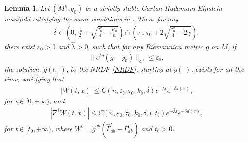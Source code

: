 \documentclass[12pt]{amsart}
\newtheorem{lemma}{Lemma}[section]
\begin{document}
\begin{lemma}\label{The evolution equation of the deTurck term}
    Let $(M^n, g_0)$ be a strictly stable Cartan-Hadamard Einstein manifold satisfying the same conditions in . Then, for any 
    \begin{align}\label{extra1}
        \delta \in \left( 0, \frac{\tau_0}{2} + \sqrt{\frac{\tau_0^2}{4} - \frac{R_0}{n}} \right) \cap \left( \tau_0, \tau_0 + 2\sqrt{\frac{\tau_0^2}{4} - 2\gamma} \right),
    \end{align}
    there exist $\varepsilon_0 > 0$ and $\hat{\lambda} > 0$, such that for any Riemannian metric $g$ on $M$, if 
    \begin{align*}
         \|e^{\delta d}(g - g_0)\|_{C^1} \leq \varepsilon_0,
    \end{align*}
    the solution, $\hat{g}(t, \cdot)$, to the NRDF \eqref{NRDF}, starting at $g(\cdot)$, exists for all the time, satisfying that 
    \begin{align}\label{The evolution equation of the deTurck term result 1}
        |W(t, x)|\leq C(n,\varepsilon_0,\tau_0, k_0, \delta) e^{-\hat{\lambda} t} e^{-\delta d(x)}, 
    \end{align}
    for $t\in [0, +\infty)$, and
    \begin{align}\label{The evolution equation of the deTurck term result 2}
        |\nabla^iW(t, x)|\leq C(n,\varepsilon_0,\tau_0, k_0, \delta, i, t_0) e^{-\hat{\lambda} t} e^{-\delta d(x)},
    \end{align}
    for $t\in [t_0, +\infty)$, where $W^{i} = \hat{g}^{ab}(\hat{\Gamma}_{ab}^{i} - \Gamma_{ab}^{i})$ and $t_0 > 0$. 
\end{lemma}
\end{document}
